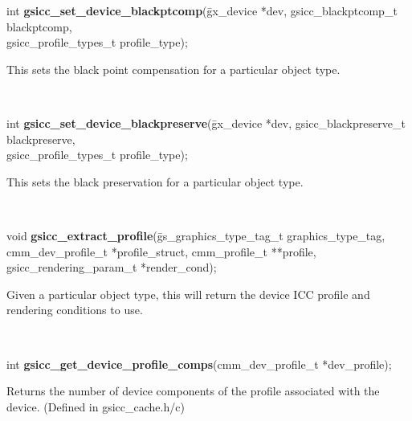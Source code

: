 \documentclass[12pt,notitlepage]{article}
\begin{document}
\begin{tabbing}
\noindent int {\bf gsicc\_set\_device\_blackptcomp}(\=gx\_device *dev, gsicc\_blackptcomp\_t blackptcomp,\\
\>gsicc\_profile\_types\_t profile\_type);\\
\end{tabbing}

\begin{minipage}[h]{6.0in}
This sets the black point compensation for a particular object type.
\end{minipage}\\

\begin{tabbing}
\noindent int {\bf gsicc\_set\_device\_blackpreserve}(\=gx\_device *dev, gsicc\_blackpreserve\_t blackpreserve,\\
\>gsicc\_profile\_types\_t profile\_type);\\
\end{tabbing}

\begin{minipage}[h]{6.0in}
This sets the black preservation for a particular object type.
\end{minipage}\\

\begin{tabbing}
\noindent void {\bf gsicc\_extract\_profile}(\=gs\_graphics\_type\_tag\_t graphics\_type\_tag,\\
                       \>cmm\_dev\_profile\_t *profile\_struct,
                       cmm\_profile\_t **profile,\\
                       \>gsicc\_rendering\_param\_t *render\_cond);\\
\end{tabbing}

\begin{minipage}[h]{6.0in}
Given a particular object type, this will return the device ICC profile and rendering conditions to use.
\end{minipage}\\

\begin{tabbing}
\noindent int  {\bf gsicc\_get\_device\_profile\_comps}(cmm\_dev\_profile\_t *dev\_profile);\\
\end{tabbing}

\begin{minipage}[h]{6.0in}
Returns the number of device components of the profile associated with the device. (Defined in gsicc\_cache.h/c)
\end{minipage}\\
\end{document}
